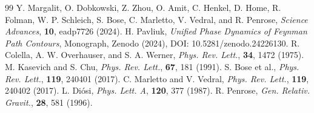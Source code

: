 \documentclass[11pt,a4paper]{article}
\begin{document}
\begin{thebibliography}{99}
 Y. Margalit, O. Dobkowski, Z. Zhou, O. Amit, C. Henkel, D. Home, R. Folman, W. P. Schleich, S. Bose, C. Marletto, V. Vedral, and R. Penrose, \textit{Science Advances}, \textbf{10}, eadp7726 (2024).
 H. Pavliuk, \textit{Unified Phase Dynamics of Feynman Path Contours}, Monograph, Zenodo (2024), DOI: 10.5281/zenodo.24226130.
 R. Colella, A. W. Overhauser, and S. A. Werner, \textit{Phys. Rev. Lett.}, \textbf{34}, 1472 (1975).
 M. Kasevich and S. Chu, \textit{Phys. Rev. Lett.}, \textbf{67}, 181 (1991).
 S. Bose et al., \textit{Phys. Rev. Lett.}, \textbf{119}, 240401 (2017).
 C. Marletto and V. Vedral, \textit{Phys. Rev. Lett.}, \textbf{119}, 240402 (2017).
 L. Diósi, \textit{Phys. Lett. A}, \textbf{120}, 377 (1987).
 R. Penrose, \textit{Gen. Relativ. Gravit.}, \textbf{28}, 581 (1996).
\end{thebibliography}
\end{document}
